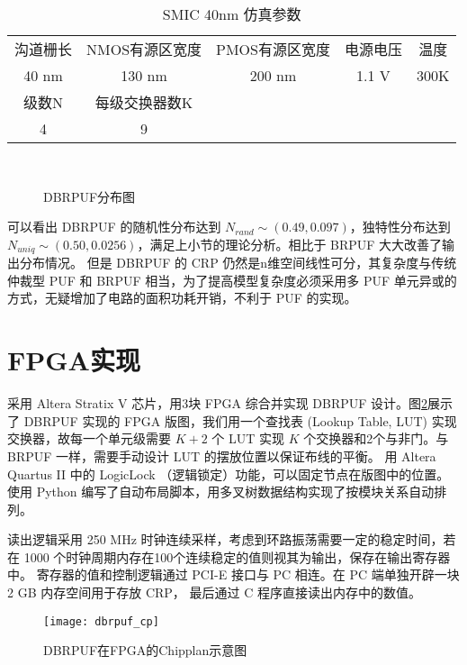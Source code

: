 \begin{table}[thb]
\centering
\caption{SMIC 40nm 仿真参数}\label{tab:dbr_simu_list}
\begin{tabular}{ccccc}
\hline
沟道栅长 & NMOS有源区宽度 & PMOS有源区宽度 & 电源电压 & 温度 \\
40 nm   & 130 nm       & 200 nm        & 1.1 V  & 300K \\
\hline
级数N & 每级交换器数K & & &\\
4 & 9 & & &\\
\hline
\end{tabular}
\end{table}


\begin{figure}[htb!]
\centering
{}\\
\caption{DBRPUF分布图}
\label{fig:dbrpuf_dist}
\end{figure}

可以看出 DBRPUF 的随机性分布达到 $ N_{rand}\sim(0.49,0.097) $，独特性分布达到 $ N_{uniq}\sim(0.50,0.0256) $，满足上小节的理论分析。相比于 BRPUF 大大改善了输出分布情况。
但是 DBRPUF 的 CRP 仍然是n维空间线性可分，其复杂度与传统仲裁型 PUF 和 BRPUF 相当，为了提高模型复杂度必须采用多 PUF 单元异或的方式，无疑增加了电路的面积功耗开销，不利于 PUF 的实现。


\section{FPGA实现}
采用 Altera Stratix V 芯片，用3块 FPGA 综合并实现 DBRPUF 设计。图\ref{fig:dbrpuf_chipplan}展示了 DBRPUF 实现的 FPGA 版图，我们用一个查找表 (Lookup Table, LUT) 实现交换器，故每一个单元级需要 $ K+2 $ 个 LUT 实现 $ K $ 个交换器和2个与非门。与 BRPUF 一样，需要手动设计 LUT 的摆放位置以保证布线的平衡。
用 Altera Quartus II 中的 LogicLock （逻辑锁定）功能，可以固定节点在版图中的位置。使用 Python 编写了自动布局脚本，用多叉树数据结构实现了按模块关系自动排列。

读出逻辑采用 250 MHz 时钟连续采样，考虑到环路振荡需要一定的稳定时间，若在 1000 个时钟周期内存在100个连续稳定的值则视其为输出，保存在输出寄存器中。
寄存器的值和控制逻辑通过 PCI-E 接口与 PC 相连。在 PC 端单独开辟一块2 GB 内存空间用于存放 CRP， 最后通过 C 程序直接读出内存中的数值。


\begin{figure}[htb]
\centering
\texttt{[image: dbrpuf\_cp]}
\caption{DBRPUF在FPGA的Chipplan示意图}
\label{fig:dbrpuf_chipplan}
\end{figure}

